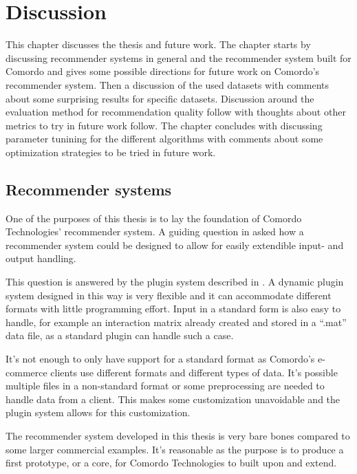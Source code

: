 \chapter{Discussion}\label{cha:discussion}

This chapter discusses the thesis and future work. The chapter starts by discussing recommender systems in general and the recommender system built for Comordo and gives some possible directions for future work on Comordo's recommender system. Then a discussion of the used datasets with comments about some surprising results for specific datasets. Discussion around the evaluation method for recommendation quality follow with thoughts about other metrics to try in future work follow. The chapter concludes with discussing parameter tunining for the different algorithms with comments about some optimization strategies to be tried in future work.


\section{Recommender systems}

One of the purposes of this thesis is to lay the foundation of Comordo Technologies' recommender system. A guiding question in  asked how a recommender system could be designed to allow for easily extendible input- and output handling.

This question is answered by the plugin system described in . A dynamic plugin system designed in this way is very flexible and it can accommodate different formats with little programming effort. Input in a standard form is also easy to handle, for example an interaction matrix already created and stored in a ``.mat'' data file, as a standard plugin can handle such a case.

It's not enough to only have support for a standard format as Comordo's e-commerce clients use different formats and different types of data. It's possible multiple files in a non-standard format or some preprocessing are needed to handle data from a client. This makes some customization unavoidable and the plugin system allows for this customization.

The recommender system developed in this thesis is very bare bones compared to some larger commercial examples. It's reasonable as the purpose is to produce a first prototype, or a core, for Comordo Technologies to built upon and extend.



